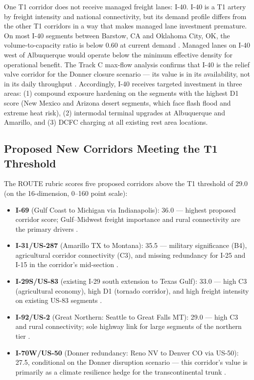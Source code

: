 One T1 corridor does not receive managed freight lanes: I-40. I-40 is a T1 artery by freight intensity and national connectivity, but its demand profile differs from the other T1 corridors in a way that makes managed lane investment premature. On most I-40 segments between Barstow, CA and Oklahoma City, OK, the volume-to-capacity ratio is below 0.60 at current demand \citep{FHWA_HPMS2022}. Managed lanes on I-40 west of Albuquerque would operate below the minimum effective density for operational benefit. The Track C max-flow analysis confirms that I-40 is the relief valve corridor for the Donner closure scenario --- its value is in its availability, not in its daily throughput \citep{ROUTE_C2}. Accordingly, I-40 receives targeted investment in three areas: (1) compound exposure hardening on the segments with the highest D1 score (New Mexico and Arizona desert segments, which face flash flood and extreme heat risk), (2) intermodal terminal upgrades at Albuquerque and Amarillo, and (3) DCFC charging at all existing rest area locations.

\subsection{Proposed New Corridors Meeting the T1 Threshold}

The ROUTE rubric scores five proposed corridors above the T1 threshold of 29.0 (on the 16-dimension, 0--160 point scale):

\begin{itemize}
  \item \textbf{I-69} (Gulf Coast to Michigan via Indianapolis): 36.0 --- highest proposed corridor score; Gulf--Midwest freight importance and rural connectivity are the primary drivers \citep{ROUTE_B1}.
  \item \textbf{I-31/US-287} (Amarillo TX to Montana): 35.5 --- military significance (B4), agricultural corridor connectivity (C3), and missing redundancy for I-25 and I-15 in the corridor's mid-section \citep{ROUTE_B1}.
  \item \textbf{I-29S/US-83} (existing I-29 south extension to Texas Gulf): 33.0 --- high C3 (agricultural economy), high D1 (tornado corridor), and high freight intensity on existing US-83 segments \citep{ROUTE_B1}.
  \item \textbf{I-92/US-2} (Great Northern: Seattle to Great Falls MT): 29.0 --- high C3 and rural connectivity; sole highway link for large segments of the northern tier \citep{ROUTE_B1}.
  \item \textbf{I-70W/US-50} (Donner redundancy: Reno NV to Denver CO via US-50): 27.5, conditional on the Donner disruption scenario --- this corridor's value is primarily as a climate resilience hedge for the transcontinental trunk \citep{ROUTE_D2}.
\end{itemize}
